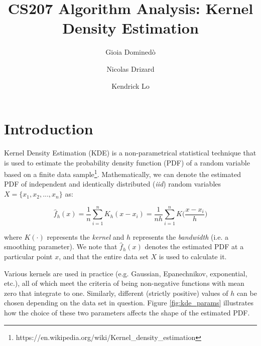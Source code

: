 \documentclass[11pt]{article}
\title{CS207 Algorithm Analysis: Kernel Density Estimation}
\author{Gioia Domined\`o \and Nicolas Drizard \and Kendrick Lo}
\begin{document}
\maketitle{}

\pagestyle{plain}

\section{Introduction}

Kernel Density Estimation (KDE) is a non-parametrical statistical technique that is used to estimate the probability density function (PDF) of a random variable based on a finite data sample\footnote{https://en.wikipedia.org/wiki/Kernel\_density\_estimation}.  Mathematically, we can denote the estimated PDF of independent and identically distributed (\textit{iid}) random variables $X=\{x_1, x_2, ..., x_n\}$ as:

\begin{equation} \label{eq:kde}
\hat{f}_h(x) = \frac{1}{n} \sum_{i=1}^n K_h(x - x_i) = \frac{1}{nh} \sum_{i=1}^n K \Big( \frac{x - x_i}{h} \Big)
\end{equation}

\noindent where $K(\cdot)$ represents the \textit{kernel} and $h$ represents the \textit{bandwidth} (i.e. a smoothing parameter). We note that $\hat{f}_h(x)$ denotes the estimated PDF at a particular point $x$, and that the entire data set $X$ is used to calculate it. \medskip

\noindent Various kernels are used in practice (e.g. Gaussian, Epanechnikov, exponential, etc.), all of which meet the criteria of being non-negative functions with mean zero that integrate to one. Similarly, different (strictly positive) values of $h$ can be chosen depending on the data set in question. Figure \ref{fig:kde_params} illustrates how the choice of these two parameters affects the shape of the estimated PDF.
\end{document}
